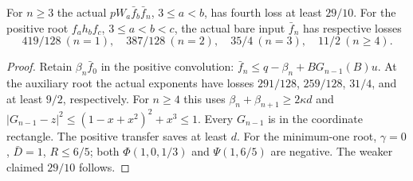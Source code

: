 \begin{corollary}
\label{cor:odd-complete:bare}
For $n\ge3$ the actual $pW_a\bar f_b\bar f_n$, $3\le a<b$,
has fourth loss at least $29/10$.
For the positive root $f_a h_bf_c$, $3\le a<b<c$, the actual
bare input $\bar f_n$ has respective losses
\[
 419/128\ (n=1),\quad387/128\ (n=2),\quad35/4\ (n=3),
 \quad11/2\ (n\ge4).
\]
\end{corollary}
\begin{proof}
Retain $\beta_n\bar f_0$ in the positive convolution:
$\bar f_n\le q-\beta_n+BG_{n-1}(B)u$.
At the auxiliary root the actual exponents have losses
$291/128$, $259/128$, $31/4$, and at least $9/2$, respectively.
For $n\ge4$ this uses
$\beta_n+\beta_{n+1}\ge2\kappa d$ and
$|G_{n-1}-z|^2\le(1-x+x^2)^2+x^3\le1$.
Every $G_{n-1}$ is in the coordinate rectangle.
The positive transfer saves at least $d$.
For the minimum-one root, $\gamma=0$, $\bar D=1$, $R\le6/5$;
both $\Phi(1,0,1/3)$ and $\Psi(1,6/5)$ are negative.
The weaker claimed $29/10$ follows.
\end{proof}
